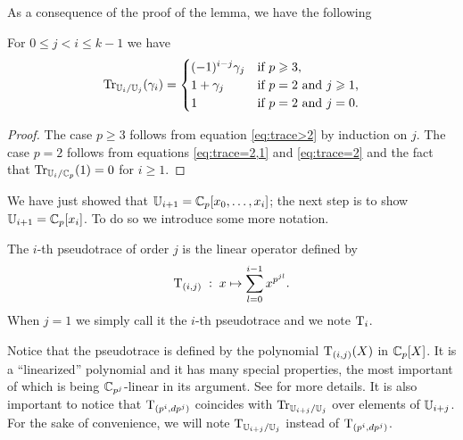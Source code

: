 As a consequence of the proof of the lemma, we have the following

\begin{corollary}
  \label{coro:trace}
  For $0\le j < i \le k-1$ we have
  \begin{equation*}
    \operatorname{Tr}_{\mathbb{U}_i/\mathbb{U}_{j}}(\gamma_i) = \begin{cases}
      (-1)^{i-j}\gamma_{j}  &\text{if $p\geqslant3$,}\\
      1+\gamma_{j}         &\text{if $p=2$ and $j\geqslant1$,}\\
      1                    &\text{if $p=2$ and $j=0$.}
    \end{cases}
  \end{equation*}
\end{corollary}
\begin{proof}
  The case $p\ge3$ follows from equation \eqref{eq:trace>2} by
  induction on $j$. The case $p=2$ follows from equations
  \eqref{eq:trace=2,1} and \eqref{eq:trace=2} and the fact that
  $\operatorname{Tr}_{\mathbb{U}_i/\mathbb{C}_p}(1)=0$ for $i\ge1$.
\end{proof}

We have just showed that $\mathbb{U}_{i+1} = \mathbb{C}_p[x_0,\ldots,x_i]$; the next
step is to show $\mathbb{U}_{i+1}=\mathbb{C}_p[x_i]$. To do so we introduce some more
notation.

\begin{definition}[Pseudotrace]
  \label{def:pseudotrace}
  The $i$-th pseudotrace of order $j$ is the linear operator
  defined by
  \begin{equation*}
    \operatorname{T}_{(i,j)} \;:\; x \mapsto \sum_{l=0}^{i-1}x^{p^{jl}}\text{.}
  \end{equation*}
  When $j=1$ we simply call it the $i$-th pseudotrace and we note
  $\operatorname{T}_i$.
\end{definition}

Notice that the pseudotrace is defined by the polynomial
$\operatorname{T}_{(i,j)}(X)$ in $\mathbb{C}_p[X]$. It is a ``linearized'' polynomial and
it has many special properties, the most important of which is being
$\mathbb{C}_{p^j}$-linear in its argument. See \cite[3.4]{LN} for more
details. It is also important to notice that $\operatorname{T}_{(p^i,dp^j)}$
coincides with $\operatorname{Tr}_{\mathbb{U}_{i+j}/\mathbb{U}_j}$ over elements of $\mathbb{U}_{i+j}$. For
the sake of convenience, we will note $\operatorname{T}_{\mathbb{U}_{i+j}/\mathbb{U}_{j}}$ instead
of $\operatorname{T}_{(p^i,dp^j)}$.

